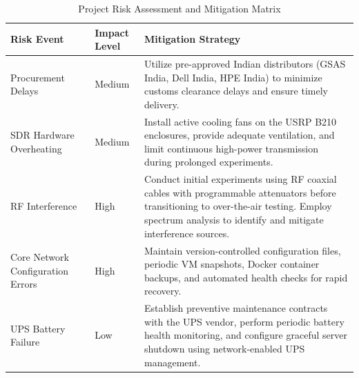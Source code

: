 \documentclass[12pt,a4paper]{article}\usepackage[a4paper,margin=1in]{geometry}\usepackage{graphicx}\usepackage{longtable}\usepackage{booktabs}\usepackage{hyperref}\usepackage{enumitem}\usepackage{amsmath}\usepackage{tikz}\usepackage{pgfgantt}\usepackage{setspace}\setstretch{1.15}\usetikzlibrary{positioning,arrows.meta,shapes.geometric}
\begin{document}
	\begin{table}[htbp]
		\centering
		\caption{Project Risk Assessment and Mitigation Matrix}
		\label{tab:risk_assessment}
		
		\begin{tabular}{
				p{3.3cm}
				p{2.2cm}
				p{9.0cm}
			}
			
			\toprule
			
			\textbf{Risk Event} &
			\textbf{Impact Level} &
			\textbf{Mitigation Strategy} \\
			
			\midrule
			
			Procurement Delays &
			Medium &
			Utilize pre-approved Indian distributors (GSAS India, Dell India, HPE India) to minimize customs clearance delays and ensure timely delivery. \\
			
			\addlinespace
			
			SDR Hardware Overheating &
			Medium &
			Install active cooling fans on the USRP B210 enclosures, provide adequate ventilation, and limit continuous high-power transmission during prolonged experiments. \\
			
			\addlinespace
			
			RF Interference &
			High &
			Conduct initial experiments using RF coaxial cables with programmable attenuators before transitioning to over-the-air testing. Employ spectrum analysis to identify and mitigate interference sources. \\
			
			\addlinespace
			
			Core Network Configuration Errors &
			High &
			Maintain version-controlled configuration files, periodic VM snapshots, Docker container backups, and automated health checks for rapid recovery. \\
			
			\addlinespace
			
			UPS Battery Failure &
			Low &
			Establish preventive maintenance contracts with the UPS vendor, perform periodic battery health monitoring, and configure graceful server shutdown using network-enabled UPS management. \\
			
			\bottomrule
			
		\end{tabular}
		
	\end{table}
		
	
\end{document}
